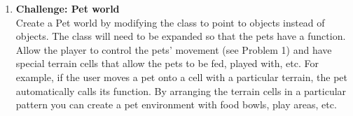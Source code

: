 \begin{enumerate}[{\bf 1.}]
\item {\bf Challenge: Pet world}\\
Create a Pet world by modifying the  class to point to  objects instead of  objects.  The  class will need to be expanded so that the pets have a  function.  Allow the player to control the pets' movement (see Problem 1) and have special terrain cells that allow the pets to be fed, played with, etc.  For example, if the user moves a pet onto a cell with a particular terrain, the pet automatically calls its  function.  By arranging the terrain cells in a particular pattern you can create a pet environment with food bowls, play areas, etc.

\end{enumerate}




